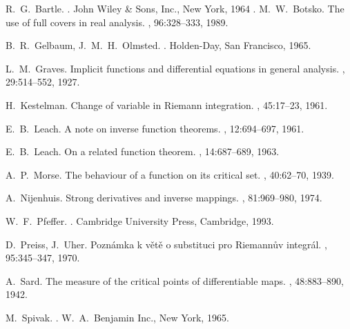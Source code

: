 \documentclass{article}
\begin{document}

\begin{thebibliography}{10}

R.~G.~Bartle.
.
\newblock John Wiley \& Sons, Inc., New York, 1964
.
M.~W.~Botsko.
\newblock The use of full covers in real analysis.
, 96:328--333, 1989.

B.~R.~Gelbaum, J.~M.~H.~Olmsted.
.
\newblock Holden-Day, San Francisco, 1965.

L.~M.~Graves.
\newblock Implicit functions and differential equations in general ana\-ly\-sis.
, 29:514--552, 1927.

H.~Kestelman.
\newblock Change of variable in Riemann integration.
, 45:17--23, 1961.

E.~B.~Leach.
\newblock A note on inverse function theorems.
, 12:694--697, 1961.

E.~B.~Leach.
\newblock On a related function theorem.
, 14:687--689, 1963.

A.~P.~Morse.
\newblock The behaviour of a function on its critical set.
, 40:62--70, 1939.

A.~Nijenhuis.
\newblock Strong derivatives and inverse mappings.
, 81:969--980, 1974.

W.~F.~Pfeffer.
.
\newblock Cambridge University Press, Cambridge, 1993.

D.~Preiss, J.~Uher.
\newblock Pozn\'{a}mka k v\v{e}t\v{e} o substituci pro Riemann\r{u}v
integr\'{a}l.
, 95:345--347, 1970.

A.~Sard.
\newblock The measure of the critical points of diffe\-rentiable maps.
, 48:883--890, 1942.

M.~Spivak.
.
\newblock W.~A.~Benjamin Inc., New York, 1965.

\end{thebibliography}
\end{document}
